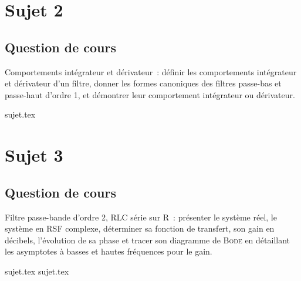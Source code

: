 \documentclass[a4paper, 11pt]{book}
\begin{document}
\chapter{Sujet 2}
\section{Question de cours}

Comportements intégrateur et dérivateur~: définir les comportements intégrateur
et dérivateur d'un filtre, donner les formes canoniques des filtres passe-bas et
passe-haut d'ordre 1, et démontrer leur comportement intégrateur ou dérivateur.

{sujet.tex}

\resetQ
\newpage

\chapter{Sujet 3}
\section{Question de cours}

Filtre passe-bande d'ordre 2, RLC série sur R~: présenter le système réel, le
système en RSF complexe, déterminer sa fonction de transfert, son gain en
décibels, l'évolution de sa phase et tracer son diagramme de \textsc{Bode} en
détaillant les asymptotes à basses et hautes fréquences pour le gain.

{sujet.tex}
{sujet.tex}
\end{document}

